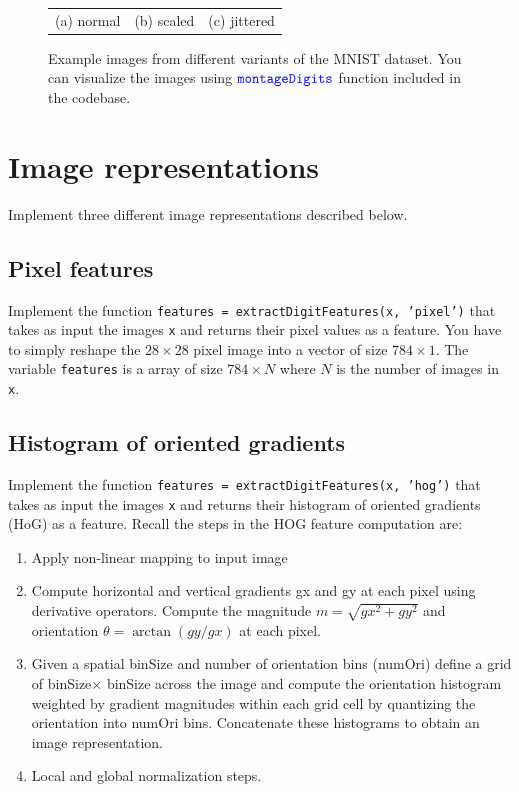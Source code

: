 \documentclass[10pt,letterpaper]{article}
\newcommand{\cmd}[1] {{\color{blue}\texttt{#1}}}
\begin{document}
\begin{figure}[h]
\begin{tabular}{ccc}
(a) normal & (b) scaled & (c) jittered \\
\end{tabular}
\caption{Example images from different variants of the MNIST dataset. You can visualize the images using $\cmd{montageDigits}$ function included in the codebase.} 
\end{figure}







\newpage

\section{Image representations}

Implement three different image representations described below. 

\subsection{Pixel features}
Implement the function \cmd{features = extractDigitFeatures(x, 'pixel')} that takes as input the images \cmd{x} and returns their pixel values as a feature. You have to simply reshape the $28\times28$ pixel image into a vector of size $784\times 1$. The variable \cmd{features} is a array of size $784\times N$ where $N$ is the number of images in \cmd{x}. 

\subsection{Histogram of oriented gradients}
Implement the function \cmd{features = extractDigitFeatures(x, 'hog')} that takes as input the images \cmd{x} and returns their histogram of oriented gradients (HoG) as a feature. Recall the steps in the HOG feature computation are:
\begin{enumerate}
\item Apply non-linear mapping to input image
\item Compute horizontal and vertical gradients gx and gy at each pixel using derivative operators. Compute the magnitude $m = \sqrt{gx^2 + gy^2}$ and orientation $\theta=\arctan(gy/gx)$ at each pixel. 
\item Given a spatial binSize and number of orientation bins (numOri) define a grid of binSize$\times$ binSize across the image and compute the orientation histogram weighted by gradient magnitudes within each grid cell by quantizing the orientation into numOri bins. Concatenate these histograms to obtain an image representation.
\item Local and global normalization steps.
\end{enumerate}
\end{document}
